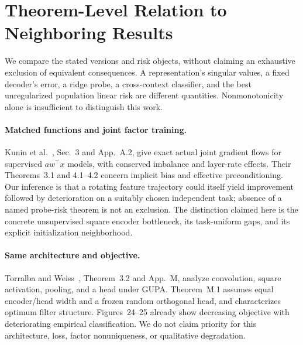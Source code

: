 \section{Theorem-Level Relation to Neighboring Results}
\label{supp:literature}
We compare the stated versions and risk objects, without claiming an exhaustive exclusion of equivalent consequences. A representation's singular values, a fixed decoder's error, a ridge probe, a cross-context classifier, and the best unregularized population linear risk are different quantities. Nonmonotonicity alone is insufficient to distinguish this work.

\paragraph{Matched functions and joint factor training.}
Kunin et al.~\cite{kunin2024rich}, Sec.~3 and App.~A.2, give exact actual joint gradient flows for supervised $aw^\top x$ models, with conserved imbalance and layer-rate effects. Their Theorems~3.1 and 4.1--4.2 concern implicit bias and effective preconditioning. Our inference is that a rotating feature trajectory could itself yield improvement followed by deterioration on a suitably chosen independent task; absence of a named probe-risk theorem is not an exclusion. The distinction claimed here is the concrete unsupervised square encoder bottleneck, its task-uniform gaps, and its explicit initialization neighborhood.

\paragraph{Same architecture and objective.}
Torralba and Weiss~\cite{torralba2026theory}, Theorem~3.2 and App.~M, analyze convolution, square activation, pooling, and a head under GUPA. Theorem~M.1 assumes equal encoder/head width and a frozen random orthogonal head, and characterizes optimum filter structure. Figures~24--25 already show decreasing objective with deteriorating empirical classification. We do not claim priority for this architecture, loss, factor nonuniqueness, or qualitative degradation.

